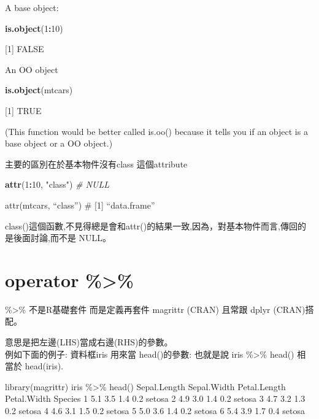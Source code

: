 \documentclass[]{book}
\newenvironment{Shaded}{\begin{snugshade}}{\end{snugshade}}
\newcommand{\CommentTok}[1]{\textcolor[rgb]{0.56,0.35,0.01}{\textit{#1}}}
\newcommand{\DecValTok}[1]{\textcolor[rgb]{0.00,0.00,0.81}{#1}}
\newcommand{\KeywordTok}[1]{\textcolor[rgb]{0.13,0.29,0.53}{\textbf{#1}}}
\newcommand{\NormalTok}[1]{#1}
\newcommand{\OperatorTok}[1]{\textcolor[rgb]{0.81,0.36,0.00}{\textbf{#1}}}
\newcommand{\StringTok}[1]{\textcolor[rgb]{0.31,0.60,0.02}{#1}}
\theoremstyle{definition}
\theoremstyle{definition}
\theoremstyle{definition}
\theoremstyle{remark}
\begin{document}
A base object:

\begin{Shaded}
\begin{Highlighting}[]
\KeywordTok{is.object}\NormalTok{(}\DecValTok{1}\OperatorTok{:}\DecValTok{10}\NormalTok{)}
\end{Highlighting}
\end{Shaded}

{[}1{]} FALSE

An OO object

\begin{Shaded}
\begin{Highlighting}[]
\KeywordTok{is.object}\NormalTok{(mtcars)}
\end{Highlighting}
\end{Shaded}

{[}1{]} TRUE

(This function would be better called is.oo() because it tells you if an
object is a base object or a OO object.)

主要的區別在於基本物件沒有class 這個attribute

\begin{Shaded}
\begin{Highlighting}[]
\KeywordTok{attr}\NormalTok{(}\DecValTok{1}\OperatorTok{:}\DecValTok{10}\NormalTok{, }\StringTok{"class"}\NormalTok{) }\CommentTok{#  NULL}
\end{Highlighting}
\end{Shaded}

attr(mtcars, ``class'') \# {[}1{]} ``data.frame''

class()這個函數,不見得總是會和attr()的結果一致,因為，對基本物件而言,傳回的是後面討論,而不是
NULL。

\hypertarget{operator}{%
\section{operator \%\textgreater{}\%}\label{operator}}

\%\textgreater{}\% 不是R基礎套件 而是定義再套件 magrittr (CRAN) 且常跟
dplyr (CRAN)搭配。

意思是把左邊(LHS)當成右邊(RHS)的參數。\\
例如下面的例子: 資料框iris 用來當 head()的參數: 也就是說 iris
\%\textgreater{}\% head() 相當於 head(iris).

library(magrittr) iris \%\textgreater{}\% head() Sepal.Length
Sepal.Width Petal.Length Petal.Width Species 1 5.1 3.5 1.4 0.2 setosa 2
4.9 3.0 1.4 0.2 setosa 3 4.7 3.2 1.3 0.2 setosa 4 4.6 3.1 1.5 0.2 setosa
5 5.0 3.6 1.4 0.2 setosa 6 5.4 3.9 1.7 0.4 setosa
\end{document}
